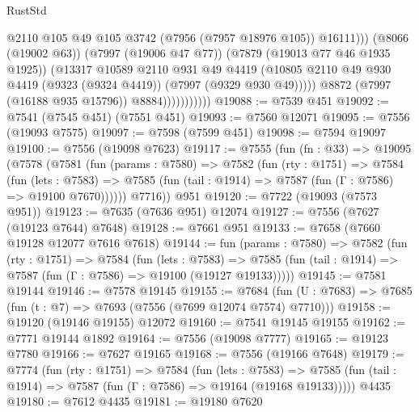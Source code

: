 \begin{lexlean}{RustStd}
\begin{coremodule}
{\begin{coremodule}
{{{{{{{{{{{{{{{{{{{{{{{{{{{{{{{{{{{{{{{{{{{                                  @2110
                                  @105
                                  @49
                                  @105
                                  @3742
                                  (@7956 (@7957 @18976 @105))
                                  @16111)))
                            (@8066 (@19002 @63))
                            (@7997 (@19006 @47 @77))
                            (@7879 (@19013 @77 @46 @1935 @1925))
                            (@13317
                              @10589
                              @2110
                              @931
                              @49
                              @4419
                              (@10805
                                @2110
                                @49
                                @930
                                @4419
                                (@9323 (@9324 @4419))
                                (@7997 (@9329 @930 @49)))))
                          @8872
                          (@7997 (@16188 @935 @15796))
                          @8884)))))))))))
@19088 := @7539 @451
@19092 := @7541 (@7545 @451) (@7551 @451)
@19093 := @7560 @12071
@19095 := @7556 (@19093 @7575)
@19097 := @7598 (@7599 @451)
@19098 := @7594 @19097
@19100 := @7556 (@19098 @7623)
@19117 := @7555
    (fun (fn : @33) =>
    @19095
      (@7578
        (@7581
          (fun (params : @7580) =>
          @7582
            (fun (rty : @1751) =>
            @7584
              (fun (lets : @7583) =>
              @7585 (fun (tail : @1914) => @7587 (fun (Γ : @7586) => @19100 @7670))))))
        @7716))
    @951
@19120 := @7722 (@19093 (@7573 @951))
@19123 := @7635 (@7636 @951) @12074
@19127 := @7556 (@7627 (@19123 @7644) @7648)
@19128 := @7661 @951
@19133 := @7658 (@7660 @19128 @12077 @7616 @7618)
@19144 := fun (params : @7580) =>
  @7582
    (fun (rty : @1751) =>
    @7584
      (fun (lets : @7583) =>
      @7585 (fun (tail : @1914) => @7587 (fun (Γ : @7586) => @19100 (@19127 @19133)))))
@19145 := @7581 @19144
@19146 := @7578 @19145
@19155 := @7684
    (fun (U : @7683) => @7685 (fun (t : @7) => @7693 (@7556 (@7699 @12074 @7574) @7710)))
@19158 := @19120 (@19146 @19155) @12072
@19160 := @7541 @19145 @19155
@19162 := @7771 @19144 @1892
@19164 := @7556 (@19098 @7777)
@19165 := @19123 @7780
@19166 := @7627 @19165
@19168 := @7556 (@19166 @7648)
@19179 := @7774
    (fun (rty : @1751) =>
    @7584
      (fun (lets : @7583) =>
      @7585 (fun (tail : @1914) => @7587 (fun (Γ : @7586) => @19164 (@19168 @19133)))))
    @4435
@19180 := @7612 @4435
@19181 := @19180 @7620
}}}}}}}}}}}}}}}}}}}}}}}}}}}}}}}}}}}}}}}}}}}
\end{coremodule}}
\end{coremodule}
\end{lexlean}
